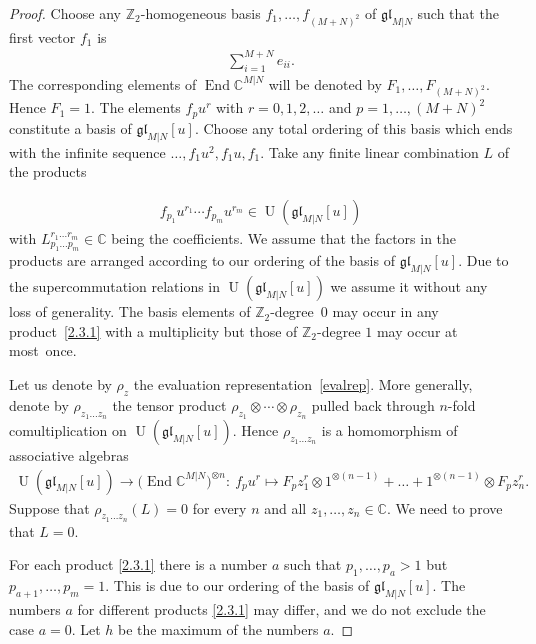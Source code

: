 \documentclass[10pt,a4paper]{amsart}
\numberwithin{equation}{section}
\def\CC{{\mathbb{C}}}
\def\CMN{\CC^{M|N}}
\def\End{\operatorname{End}}
\def\g{\glMN [u]}
\def\glMN{\mathfrak{gl}_{M|N}}
\def\ot{\otimes}
\def\Ug{\operatorname{U}(\g)}
\def\ZZ{\mathbb{Z}}
\begin{document}
\begin{proof}
Choose any $\ZZ_2 $-homogeneous
basis $f_1,\dots, f_{(M+N)^2}$ of $\glMN$
such that the first vector $f_1$ is
\begin{gather}\label{esum}
\sum_{i=1}^{M+N}e_{ii} .
\end{gather}
The corresponding elements of $\End\CMN$
will be denoted by $F_1,\dots, F_{(M+N)^2} $.
Hence $F_1=1 $.
The elements $f_{p} u^{r}$
with $r=0 ,1 ,2 , \dots$
and $p=1 ,\dots, (M+N)^2$ constitute a basis of $\g $.
Choose any total ordering of this basis which ends with the
infinite sequence
$\dots , f_1 u^{2}, f_1 u , f_1$.
Take any finite linear combination $L$ of the products{\samepage
\begin{gather}\label{2.3.1}
f_{p_1}u^{r_1}\cdots f_{p_m}u^{r_m}\in\Ug
\end{gather}
with $L_{p_1\dots p_m}^{r_1\dots r_m}\in\CC$
being the coefficients.
We assume that the factors in the products are
arranged according to our ordering of the basis of $\g $.
Due to the supercommutation relations in $\Ug$
we assume it without any loss of generality.
The basis elements of $\ZZ_2 $-degree~$0$
may occur in any product~\eqref{2.3.1} with a multiplicity
but those of $\ZZ_2 $-degree $1$ may occur at most~once.

}

Let us denote by $\rho_z$ the evaluation representation~\eqref{evalrep}.
More generally, denote by $\rho_{z_1\dots z_n}$ the tensor product
$\rho_{z_1}\ot\cdots\ot\rho_{z_n}$
pulled back through $n $-fold comultiplication on $\Ug $.
Hence $\rho_{z_1\dots z_n}$ is a homomorphism of
associative algebras
\begin{gather*}
\Ug\to\big(\End\CMN\big)^{\ot n}\colon \
f_{p} u^{r}\mapsto
F_{p} z_1^{r}\ot1^{\ot (n-1)}+\dots+
1^{\ot (n-1)}\ot F_{p} z_n^{r} .
\end{gather*}
Suppose that $\rho_{z_1\dots z_n}(L)=0$ for every $n$
and all $z_1,\dots, z_n\in\CC $.
We need to prove that $L=0 $.

For each product \eqref{2.3.1} there is a number $a$ such that
$p_1,\dots, p_{a}>1$ but $p_{a+1} ,\dots, p_m=1 $.
This is due to our ordering of the basis of $\g $.
The numbers $a$ for different products
\eqref{2.3.1} may differ, and we do not exclude the case $a=0$.
Let $h$ be the maximum of the numbers $a $.


\end{proof}
\end{document}
